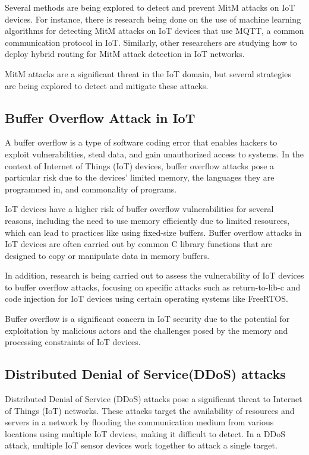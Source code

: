 Several methods are being explored to detect and prevent MitM attacks on IoT devices. For instance, there is research being done on the use of machine learning algorithms for detecting MitM attacks on IoT devices that use MQTT, a common communication protocol in IoT\cite{sultan2022man}. Similarly, other researchers are studying how to deploy hybrid routing for MitM attack detection in IoT networks\cite{kang2019hybrid}.

MitM attacks are a significant threat in the IoT domain, but several strategies are being explored to detect and mitigate these attacks.

\subsection{Buffer Overflow Attack in IoT}
A buffer overflow is a type of software coding error that enables hackers to exploit vulnerabilities, steal data, and gain unauthorized access to systems\cite{fortinet2023}. In the context of Internet of Things (IoT) devices, buffer overflow attacks pose a particular risk due to the devices' limited memory, the languages they are programmed in, and commonality of programs\cite{altium2023}.

IoT devices have a higher risk of buffer overflow vulnerabilities for several reasons, including the need to use memory efficiently due to limited resources, which can lead to practices like using fixed-size buffers\cite{igal2023}. Buffer overflow attacks in IoT devices are often carried out by common C library functions that are designed to copy or manipulate data in memory buffers\cite{igal2023}.

In addition, research is being carried out to assess the vulnerability of IoT devices to buffer overflow attacks, focusing on specific attacks such as return-to-lib-c and code injection for IoT devices using certain operating systems like FreeRTOS\cite{mullen2019assessment}.

Buffer overflow is a significant concern in IoT security due to the potential for exploitation by malicious actors and the challenges posed by the memory and processing constraints of IoT devices.


\subsection{Distributed Denial of Service(DDoS) attacks}
Distributed Denial of Service (DDoS) attacks pose a significant threat to Internet of Things (IoT) networks. These attacks target the availability of resources and servers in a network by flooding the communication medium from various locations using multiple IoT devices, making it difficult to detect\cite{kumari2023comprehensive}. In a DDoS attack, multiple IoT sensor devices work together to attack a single target\cite{kumar2022distributed}.

